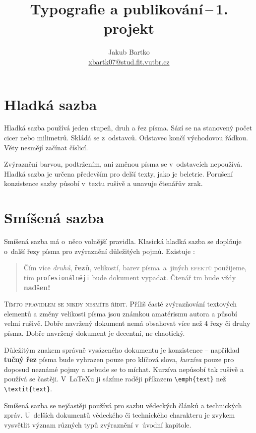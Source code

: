 \documentclass[a4paper, 10pt, twocolumn]{article}
\title{Typografie a publikování\,--\,1. projekt}
\author{Jakub Bartko \\ \href{ mailto:xbartk07@stud.fit.vutbr.cz}{xbartk07@stud.fit.vutbr.cz}}
\date{}
\begin{document}
\maketitle

\section{Hladká sazba}
Hladká sazba používá jeden stupeň, druh a řez písma.
Sází se na stanovený počet cicer nebo milimetrů.
Skládá se z~odstavců. Odstavec končí východovou řádkou.
Věty nesmějí začínat číslicí.

Zvýraznění barvou, podtržením, ani změnou písma se v~odstavcích nepoužívá.
Hladká sazba je určena především pro delší texty, jako je beletrie.
Porušení konzistence sazby působí v~textu rušivě a unavuje čtenářův zrak.


\section{Smíšená sazba}
\label{sec:2}
Smíšená sazba má o~něco volnější pravidla.
Klasická hladká sazba se doplňuje o~další řezy písma pro zvýraznění důležitých pojmů.
Existuje :

\begin{quotation}
Čím více \emph{druhů}, \textbf{řezů}, {\tiny velikostí}, {\color{red} barev} písma~a~jiných \textsc{efektů} použijeme, tím \texttt{profesionálněji} bude {\Large {}\selectfont dokument} vypadat.
{\huge Č}{\LARGE t}{\Large e}{\large n}á{\small ř} {\footnotesize t}{}{\tiny m} bude vždy {\Huge \textbf{nadšen!}}
\end{quotation}

\textsc{Tímto pravidlem se nikdy nesmíte řídit.}
Příliš časté zvýrazňování textových elementů a změny velikosti písma jsou známkou amatérismu autora a působí velmi rušivě.
Dobře navržený dokument nemá obsahovat více než 4 řezy či druhy písma.
Dobře navržený dokument je decentní, ne chaotický.

Důležitým znakem správně vysázeného dokumentu je konzistence -- například \textbf{tučný řez} písma bude vyhrazen pouze pro klíčová slova, \emph{kurzíva} pouze pro doposud neznámé pojmy a nebude se to míchat.
Kurzíva nepůsobí tak rušivě a používá se častěji.
V~\LaTeX u ji sázíme raději příkazem \verb|\emph{text}| než \verb|\textit{text}|.

Smíšená sazba se nejčastěji používá pro sazbu vědeckých článků a technických zpráv.
U~delších dokumentů vědeckého či technického charakteru je zvykem vysvětlit význam různých typů zvýraznění v~úvodní kapitole.
\end{document}
